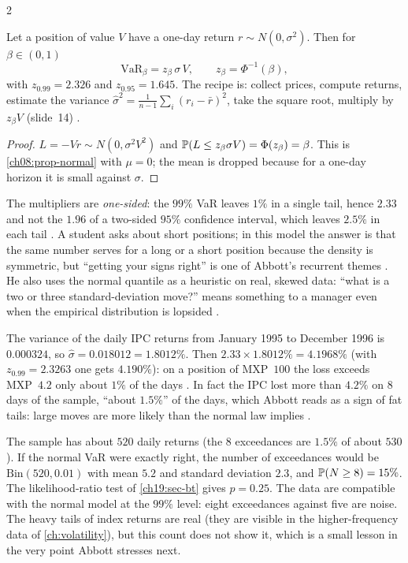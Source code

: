 \begin{paracol}{2}
\begin{proposition}\label{ch19:prop-one}
Let a position of value $V$ have a one-day return $r\sim N(0,\sigma^2)$. Then for $\beta\in(0,1)$
\[
  \mathrm{VaR}_\beta=z_\beta\,\sigma\,V,\qquad z_\beta=\Phi^{-1}(\beta),
\]
with $z_{0.99}=2.326$ and $z_{0.95}=1.645$. The recipe is: collect prices, compute returns, estimate the variance $\hat\sigma^2=\frac1{n-1}\sum_i(r_i-\bar r)^2$, take the square root, multiply by $z_\beta V$ (slide~14) .
\end{proposition}
\begin{proof}
$L=-Vr\sim N(0,\sigma^2V^2)$ and $\mathbb{P}(L\le z_\beta\sigma V)=\Phi(z_\beta)=\beta$. This is \cref{ch08:prop-normal} with $\mu=0$; the mean is dropped because for a one-day horizon it is small against $\sigma$.
\end{proof}
The multipliers are \emph{one-sided}: the $99\%$ VaR leaves $1\%$ in a single tail, hence $2.33$ and not the $1.96$ of a two-sided $95\%$ confidence interval, which leaves $2.5\%$ in each tail . A student asks about short positions; in this model the answer is that the same number serves for a long or a short position because the density is symmetric, but ``getting your signs right'' is one of Abbott's recurrent themes . He also uses the normal quantile as a heuristic on real, skewed data: ``what is a two or three standard-deviation move?'' means something to a manager even when the empirical distribution is lopsided .

\begin{example}\label{ch19:ex-ipc}
The variance of the daily IPC returns from January 1995 to December 1996 is $0.000324$, so $\hat\sigma=0.018012=1.8012\%$. Then $2.33\times1.8012\%=4.1968\%$ (with $z_{0.99}=2.3263$ one gets $4.190\%$): on a position of MXP~$100$ the loss exceeds MXP~$4.2$ only about $1\%$ of the days .
In fact the IPC lost more than $4.2\%$ on $8$ days of the sample, ``about $1.5\%$'' of the days, which Abbott reads as a sign of fat tails: large moves are more likely than the normal law implies .
\end{example}
\begin{remark}\label{ch19:rem-eight}
The sample has about $520$ daily returns (the $8$ exceedances are $1.5\%$ of about $530$). If the normal VaR were exactly right, the number of exceedances would be $\mathrm{Bin}(520,0.01)$ with mean $5.2$ and standard deviation $2.3$, and $\mathbb{P}(N\ge8)=15\%$. The likelihood-ratio test of \cref{ch19:sec-bt} gives $p=0.25$. The data are compatible with the normal model at the $99\%$ level: eight exceedances against five are noise. The heavy tails of index returns are real (they are visible in the higher-frequency data of \cref{ch:volatility}), but this count does not show it, which is a small lesson in the very point Abbott stresses next.
\end{remark}


\end{paracol}

